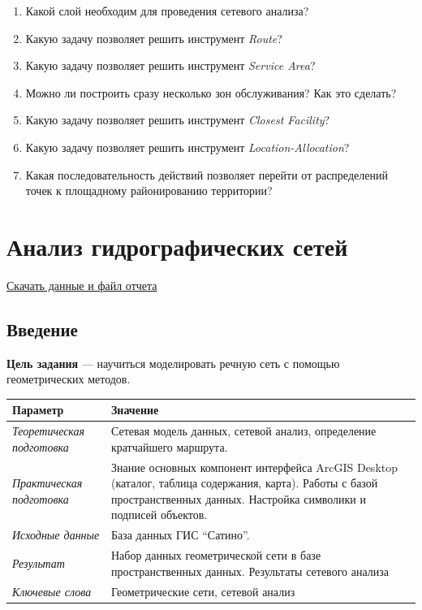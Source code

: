 \documentclass[12pt,]{book}
\begin{document}
\begin{enumerate}
\def\labelenumi{\arabic{enumi}.}
\item
  Какой слой необходим для проведения сетевого анализа?
\item
  Какую задачу позволяет решить инструмент \emph{Route}?
\item
  Какую задачу позволяет решить инструмент \emph{Service Area}?
\item
  Можно ли построить сразу несколько зон обслуживания? Как это сделать?
\item
  Какую задачу позволяет решить инструмент \emph{Closest Facility}?
\item
  Какую задачу позволяет решить инструмент \emph{Location-Allocation}?
\item
  Какая последовательность действий позволяет перейти от распределений точек к площадному районированию территории?
\end{enumerate}

\hypertarget{network-hydro}{%
\chapter{Анализ гидрографических сетей}\label{network-hydro}}

\href{http://autolab.geogr.msu.ru/gis/data/Ex13.zip}{Скачать данные и файл отчета}

\hypertarget{network-hydro-intro}{%
\section{Введение}\label{network-hydro-intro}}

\textbf{Цель задания} --- научиться моделировать речную сеть с помощью геометрических методов.

\begin{longtable}[]{@{}ll@{}}
\toprule
Параметр & Значение\tabularnewline
\midrule
\endhead
\emph{Теоретическая подготовка} & Сетевая модель данных, сетевой анализ, определение кратчайшего маршрута.\tabularnewline
\emph{Практическая подготовка} & Знание основных компонент интерфейса ArcGIS Desktop (каталог, таблица содержания, карта). Работы с базой пространственных данных. Настройка символики и подписей объектов.\tabularnewline
\emph{Исходные данные} & База данных ГИС ``Сатино''.\tabularnewline
\emph{Результат} & Набор данных геометрической сети в базе пространственных данных. Результаты сетевого анализа\tabularnewline
\emph{Ключевые слова} & Геометрические сети, сетевой анализ\tabularnewline
\bottomrule
\end{longtable}
\end{document}
